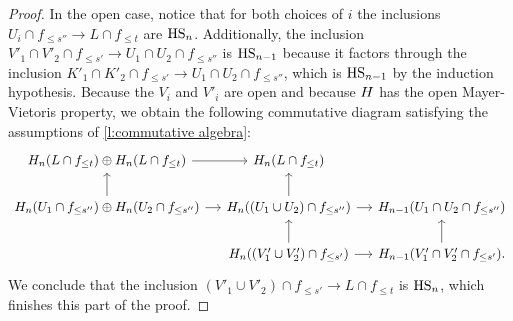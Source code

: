 \begin{proof}
	In the open case, notice that for both choices of $i$ the inclusions
	$U_i \cap f_{\leq s''} \to L \cap f_{\leq t}$
	are $\mathrm{HS}_n$.
	Additionally, the inclusion
	$V'_1 \cap V'_2 \cap f_{\leq s'} \to U_1 \cap U_2 \cap f_{\leq s''}$
	is $\mathrm{HS}_{n-1}$ because it factors through the inclusion
	$K'_1 \cap K'_2 \cap f_{\leq s'} \to U_1 \cap U_2 \cap f_{\leq s''}$,
	which is $\mathrm{HS}_{n-1}$ by the induction hypothesis.
    Because the $V_i$ and $V'_i$ are open and because $H$ has the open Mayer-Vietoris property, we obtain the following commutative diagram satisfying the assumptions of \cref{l:commutative algebra}:
	\begin{equation*}
	\begin{tikzcd}[column sep=small]
	\H_n(L \cap f_{\leq t}) \oplus \H_n(L \cap f_{\leq t}) \arrow[r] &
	\H_n(L \cap f_{\leq t}) & \\
	\H_{n}(U_1 \cap f_{\leq s''}) \oplus \H_n(U_2 \cap f_{\leq s''}) \arrow[r] \arrow[u] & 
	\H_{n}((U_1 \cup U_2) \cap f_{\leq s''}) \arrow[r] \arrow[u] &
	\H_{n-1}(U_1 \cap U_2 \cap f_{\leq s''}) \\ & 
	\H_{n}((V'_1 \cup V'_2) \cap f_{\leq s'}) \arrow[r] \arrow[u] &
	\H_{n-1}(V'_1 \cap V'_2 \cap f_{\leq s'}). \arrow[u]
	\end{tikzcd}
	\end{equation*}
	We conclude that the inclusion 
	$\left(V'_1 \cup V'_2 \right) \cap f_{\leq s'} \to L \cap f_{\leq t}$ 
	is $\mathrm{HS}_n$, which finishes this part of the proof.
	

\end{proof}
